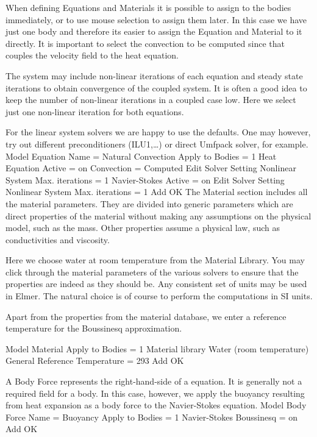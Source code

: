 When defining Equations and Materials it is possible to assign to the bodies immediately, or to use mouse
selection to assign them later. In this case we have just one body and therefore its easier to assign 
the Equation and Material to it directly.
It is important to select the 
convection to be computed since that couples the velocity field to the heat equation.

The system may include non-linear iterations of each equation and steady state iterations 
to obtain convergence of the coupled system. It is often a good idea to keep the number of 
non-linear iterations in a coupled case low. Here we select just one non-linear iteration
for both equations.

For the linear system solvers we are happy to use the defaults. One may however, try out different
preconditioners (ILU1,\ldots) or direct Umfpack solver, for example.
\ttbegin
Model
  Equation
    Name = Natural Convection
    Apply to Bodies = 1
    Heat Equation
      Active = on
      Convection = Computed
      Edit Solver Setting
        Nonlinear System
          Max. iterations = 1
    Navier-Stokes 
      Active = on
      Edit Solver Setting
        Nonlinear System
          Max. iterations = 1
    Add 
    OK
\ttend        
The Material section includes all the material parameters.
They are divided into generic parameters which are direct properties of the material
without making any assumptions on the physical model, such as the mass. Other properties assume
a physical law, such as conductivities and viscosity. 

Here we choose water at room temperature from the Material Library.
You may click through the material parameters of the various solvers to ensure that
the properties are indeed as they should be. Any consistent set of units may be used in Elmer.
The natural choice is of course to perform the computations in SI units. 

Apart from the properties from the material database, we enter a
reference temperature for the Boussinesq approximation.    

\ttbegin
Model
  Material
    Apply to Bodies = 1 
    Material library    
      Water (room temperature)
    General 
      Reference Temperature = 293
    Add
    OK
\ttend

A Body Force represents the right-hand-side of a equation. It is generally 
not a required field for a body. In this case, however, we apply the buoyancy resulting from
heat expansion as a body force to the Navier-Stokes equation.
\ttbegin
Model
  Body Force
    Name = Buoyancy
    Apply to Bodies = 1
    Navier-Stokes
      Boussinesq = on
    Add 
    OK
\ttend    

